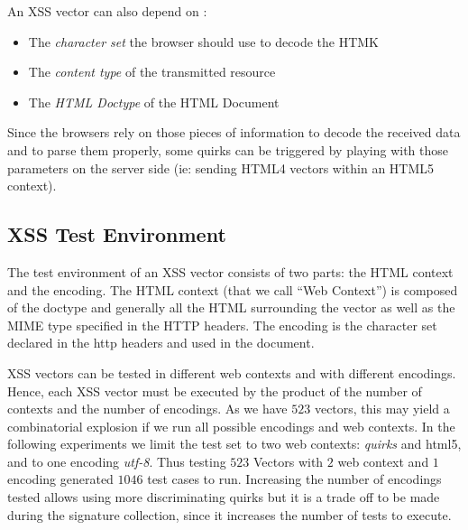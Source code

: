 \documentclass[10pt]{IEEEtran}
\begin{document}
An XSS vector can also depend on :
\begin{itemize}
\item The  \emph{character set} the browser should use to decode the HTMK 
\item The  \emph{content type} of the transmitted resource
\item The  \emph{HTML Doctype} of the HTML Document
\end{itemize}




Since the browsers rely on those pieces of information to decode the received data and to 
parse them properly, some quirks can be triggered by playing with those 
parameters on the server side (ie: sending HTML4 vectors within an HTML5 context).




\subsection{XSS Test Environment}
The test environment of an XSS vector consists of two parts:
the HTML context and the encoding. The HTML context (that we call ``Web Context'') 
is composed of  the doctype and generally all the HTML surrounding the vector as well 
as the  MIME type specified in the HTTP headers. The encoding is the character set 
declared in the http headers and used in the document.




XSS vectors can be tested in different web contexts and with different encodings. 
Hence, each XSS vector must be executed by the product of the number of contexts and the 
number of encodings. As we have $523$ vectors, this may yield a combinatorial explosion if we run all possible encodings and web contexts. 
In the following experiments we limit the test set to two web contexts: \textit{quirks} and html5, and to one encoding \textit{utf-8}. Thus testing $523$ Vectors 
with $2$ web context and $1$ encoding generated $1046$ test cases to run.
Increasing the number of encodings tested allows using more discriminating quirks
but it is a trade off to be made during the signature collection, since it increases the number of tests to execute.
\end{document}
